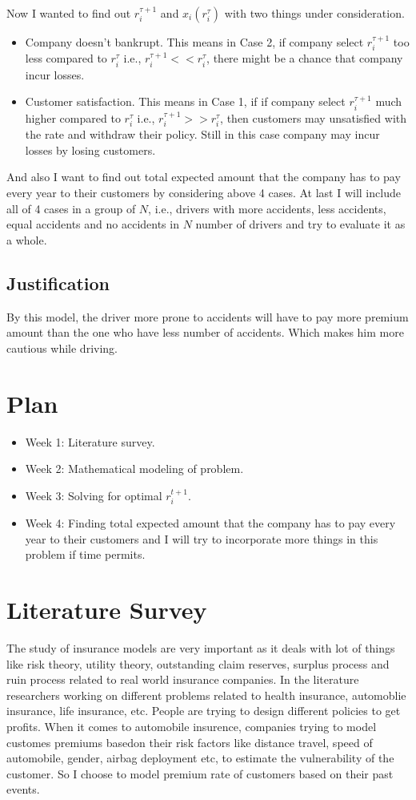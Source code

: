 \documentclass[a4paper,english,12pt]{article}
\begin{document}
Now I wanted to find out $r_i^{\tau+1}$ and $x_i(r_i^\tau)$ with two things under consideration.
\begin{itemize}
\item Company doesn't bankrupt. This means in Case 2, if company select $r_i^{\tau+1}$ too less compared to $r_i^\tau$ i.e., $r_i^{\tau+1} << r_i^\tau $, there might be a chance that company incur losses.
\item Customer satisfaction. This means in Case 1, if if company select $r_i^{\tau+1}$ much higher compared to $r_i^\tau$ i.e., $r_i^{\tau+1} >> r_i^\tau $, then customers may unsatisfied with the rate and withdraw their policy. Still in this case company may incur losses by losing customers.
\end{itemize}
And also I want to find out total expected amount that the company has to pay every year to their customers by considering above 4 cases. At last I will include all of 4 cases in  a group of $N$, i.e., drivers with more accidents, less accidents, equal accidents and no accidents in $N$ number of drivers and try to evaluate it as a whole.  

\subsection{Justification}
By this model, the driver more prone to accidents will have to pay more premium amount than the one who have less number of accidents. Which makes him more cautious while driving.
\section{Plan}
\begin{itemize}
\item Week 1: Literature survey.
\item Week 2: Mathematical modeling of problem.
\item Week 3: Solving for optimal $r_i^{t+1}$.
\item Week 4: Finding total expected amount that the company has to pay every year to their customers and I will try to incorporate more things in this problem if time permits.
\end{itemize}
\section{Literature Survey}
The study of insurance models are very important as it deals with lot of things like risk theory, utility theory, outstanding claim reserves, surplus process and ruin process related to real world insurance companies. In the literature researchers working on different problems related to health insurance, automoblie insurance, life insurance, etc. People are trying to design different policies to get profits. When it comes to automobile insurence, companies trying to model customes premiums basedon their risk factors like distance travel, speed of automobile, gender, airbag deployment etc, to estimate the vulnerability of the customer. So I choose to model premium rate of customers based on their past events.  
\newpage
\end{document}
